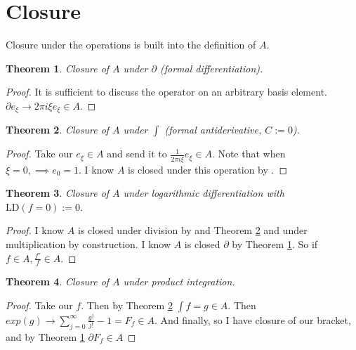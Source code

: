 \documentclass{artjlt}
\newtheorem{thm}{Theorem}
\newcommand{\?}{\textbackslash}
\begin{document}
\section{Closure}
   Closure under the operations is built into the definition of $A$.
   \begin{thm} \label{thm:1}
      Closure of $A$ under $\partial$ (formal differentiation).
   \end{thm}
   \begin{proof}
      It is sufficient to discuss the operator on an arbitrary basis element. $\partial e_\xi \to 2 \pi i \xi e_{\xi} \in A$.
   \end{proof}
   \begin{thm} \label{thm:2}
      Closure of $A$ under $\int$ (formal antiderivative, $C:=0$). 
   \end{thm}
   \begin{proof}
      Take our $e_\xi \in A$ and send it to $\frac{1}{2 \pi i \xi} e_{\xi} \in A$. Note that when $\xi = 0, \implies e_0 = 1$. I know $A$ is closed under this operation by \cite{Hormander1958}. 
   \end{proof}
   \begin{thm}
      Closure of $A$ under logarithmic differentiation with $\text{LD}(f=0) := 0$.
   \end{thm}
   \begin{proof}
      I know $A$ is closed under division by \cite{Hormander1958} and Theorem \ref{thm:2} and under multiplication by construction. I know $A$ is closed $\partial$ by Theorem \ref{thm:1}. So if $f \in A, \frac{f'}{f} \in A$.
   \end{proof}
   \begin{thm} \label{thm:4}
      Closure of $A$ under product integration.
   \end{thm}
   \begin{proof}
      Take our $f$. Then by Theorem \ref{thm:2} $\int f = g \in A$. Then $exp(g) \to \sum_{j=0}^{\infty} \frac{g^j}{j!} - 1 = F_f \in A$. 
      And finally, so I have closure of our bracket, and by Theorem \ref{thm:1} $\partial F_f \in A$    
\end{proof}
\end{document}

